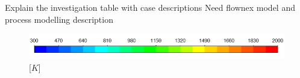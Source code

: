 \documentclass[review]{elsarticle}
\begin{document}
Explain the investigation
table with case descriptions
Need flownex model and process modelling description
\begin{figure}
\centering
\includegraphics[scale = 0.45]{TEMP_KEY} [$K$]\\
\\

\end{figure}
\end{document}
